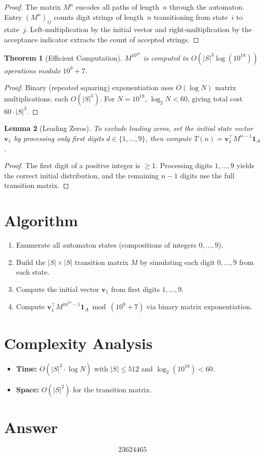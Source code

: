 \documentclass[11pt]{article}
\newtheorem{theorem}{Theorem}
\newtheorem{lemma}[theorem]{Lemma}
\begin{document}
\begin{proof}
The matrix $M^n$ encodes all paths of length~$n$ through the automaton. Entry $(M^n)_{ij}$ counts digit strings of length~$n$ transitioning from state~$i$ to state~$j$. Left-multiplication by the initial vector and right-multiplication by the acceptance indicator extracts the count of accepted strings.
\end{proof}

\begin{theorem}[Efficient Computation]
$M^{10^{18}}$ is computed in $O(|S|^3 \log(10^{18}))$ operations modulo $10^9+7$.
\end{theorem}

\begin{proof}
Binary (repeated squaring) exponentiation uses $O(\log N)$ matrix multiplications, each $O(|S|^3)$. For $N = 10^{18}$, $\log_2 N < 60$, giving total cost $60 \cdot |S|^3$.
\end{proof}

\begin{lemma}[Leading Zeros]
To exclude leading zeros, set the initial state vector~$\mathbf{v}_1$ by processing only first digits $d \in \{1,\ldots,9\}$, then compute $T(n) = \mathbf{v}_1^\top M^{n-1} \mathbf{1}_A$.
\end{lemma}

\begin{proof}
The first digit of a positive integer is $\ge 1$. Processing digits $1,\ldots,9$ yields the correct initial distribution, and the remaining $n-1$ digits use the full transition matrix.
\end{proof}

\section{Algorithm}

\begin{enumerate}
    \item Enumerate all automaton states (compositions of integers $0,\ldots,9$).
    \item Build the $|S| \times |S|$ transition matrix $M$ by simulating each digit $0,\ldots,9$ from each state.
    \item Compute the initial vector $\mathbf{v}_1$ from first digits $1,\ldots,9$.
    \item Compute $\mathbf{v}_1^\top M^{10^{18}-1} \mathbf{1}_A \bmod (10^9+7)$ via binary matrix exponentiation.
\end{enumerate}

\section{Complexity Analysis}
\begin{itemize}
    \item \textbf{Time:} $O(|S|^3 \cdot \log N)$ with $|S| \le 512$ and $\log_2(10^{18}) < 60$.
    \item \textbf{Space:} $O(|S|^2)$ for the transition matrix.
\end{itemize}

\section{Answer}

\[
\boxed{23624465}
\]
\end{document}
